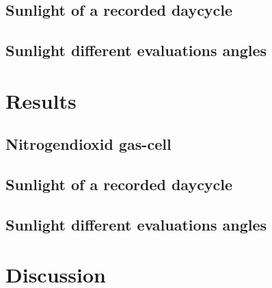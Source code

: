 \documentclass[12pt, english]{scrartcl} %
\begin{document}
\begin{multicols}{2}
\subsection{Sunlight of a recorded daycycle}

\subsection{Sunlight different evaluations angles}

\section{Results}
\subsection{Nitrogendioxid gas-cell}

\subsection{Sunlight of a recorded daycycle}

\subsection{Sunlight different evaluations angles}


\section{Discussion}
\end{multicols}
\end{document}
